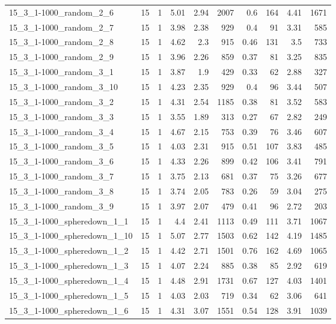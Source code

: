 \begin{center}
\begin{scriptsize}
\begin{longtable}{lrrrrrrrrr}
15\_3\_1-1000\_random\_2\_6 & 15 & 1 & 5.01 & 2.94 & 2007 & 0.6 & 164 & 4.41 & 1671\\
15\_3\_1-1000\_random\_2\_7 & 15 & 1 & 3.98 & 2.38 & 929 & 0.4 & 91 & 3.31 & 585\\
15\_3\_1-1000\_random\_2\_8 & 15 & 1 & 4.62 & 2.3 & 915 & 0.46 & 131 & 3.5 & 733\\
15\_3\_1-1000\_random\_2\_9 & 15 & 1 & 3.96 & 2.26 & 859 & 0.37 & 81 & 3.25 & 835\\
15\_3\_1-1000\_random\_3\_1 & 15 & 1 & 3.87 & 1.9 & 429 & 0.33 & 62 & 2.88 & 327\\
15\_3\_1-1000\_random\_3\_10 & 15 & 1 & 4.23 & 2.35 & 929 & 0.4 & 96 & 3.44 & 507\\
15\_3\_1-1000\_random\_3\_2 & 15 & 1 & 4.31 & 2.54 & 1185 & 0.38 & 81 & 3.52 & 583\\
15\_3\_1-1000\_random\_3\_3 & 15 & 1 & 3.55 & 1.89 & 313 & 0.27 & 67 & 2.82 & 249\\
15\_3\_1-1000\_random\_3\_4 & 15 & 1 & 4.67 & 2.15 & 753 & 0.39 & 76 & 3.46 & 607\\
15\_3\_1-1000\_random\_3\_5 & 15 & 1 & 4.03 & 2.31 & 915 & 0.51 & 107 & 3.83 & 485\\
15\_3\_1-1000\_random\_3\_6 & 15 & 1 & 4.33 & 2.26 & 899 & 0.42 & 106 & 3.41 & 791\\
15\_3\_1-1000\_random\_3\_7 & 15 & 1 & 3.75 & 2.13 & 681 & 0.37 & 75 & 3.26 & 677\\
15\_3\_1-1000\_random\_3\_8 & 15 & 1 & 3.74 & 2.05 & 783 & 0.26 & 59 & 3.04 & 275\\
15\_3\_1-1000\_random\_3\_9 & 15 & 1 & 3.97 & 2.07 & 479 & 0.41 & 96 & 2.72 & 203\\
15\_3\_1-1000\_spheredown\_1\_1 & 15 & 1 & 4.4 & 2.41 & 1113 & 0.49 & 111 & 3.71 & 1067\\
15\_3\_1-1000\_spheredown\_1\_10 & 15 & 1 & 5.07 & 2.77 & 1503 & 0.62 & 142 & 4.19 & 1485\\
15\_3\_1-1000\_spheredown\_1\_2 & 15 & 1 & 4.42 & 2.71 & 1501 & 0.76 & 162 & 4.69 & 1065\\
15\_3\_1-1000\_spheredown\_1\_3 & 15 & 1 & 4.07 & 2.24 & 885 & 0.38 & 85 & 2.92 & 619\\
15\_3\_1-1000\_spheredown\_1\_4 & 15 & 1 & 4.48 & 2.91 & 1731 & 0.67 & 127 & 4.03 & 1401\\
15\_3\_1-1000\_spheredown\_1\_5 & 15 & 1 & 4.03 & 2.03 & 719 & 0.34 & 62 & 3.06 & 641\\
15\_3\_1-1000\_spheredown\_1\_6 & 15 & 1 & 4.31 & 3.07 & 1551 & 0.54 & 128 & 3.91 & 1039\\

\end{longtable}
\end{scriptsize}
\end{center}
